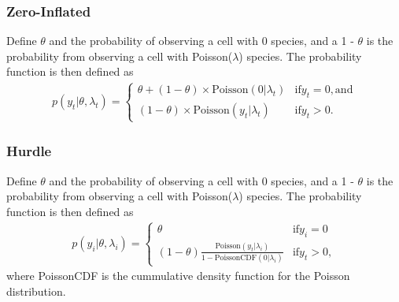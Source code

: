 \documentclass[12pt,letterpaper]{article}
\begin{document}
\subsubsection{Zero-Inflated}

Define \(\theta\) and the probability of observing a cell with 0 species, and a 1 - \(\theta\) is the probability from observing a cell with Poisson(\(\lambda\)) species. The probability function is then defined as 
\begin{equation}
  \begin{aligned}
    p(y_{t} | \theta, \lambda_{t}) = 
    \begin{cases}
      \theta + (1 - \theta) \times \mathrm{Poisson}(0 | \lambda_{t}) & \text{if} y_{t} = 0, \text{and} \\
      (1 - \theta) \times \mathrm{Poisson}(y_{t} | \lambda_{t}) & \text{if} y_{t} > 0.
    \end{cases}
  \end{aligned}
  \label{eq:zip}
\end{equation}

\subsubsection{Hurdle}

Define \(\theta\) and the probability of observing a cell with 0 species, and a 1 - \(\theta\) is the probability from observing a cell with Poisson(\(\lambda\)) species. The probability function is then defined as 
\begin{equation}
  \begin{aligned}
    p(y_{i} | \theta, \lambda_{i}) = 
    \begin{cases}
      \theta & \text{if} y_{i} = 0\\
      (1 - \theta) \frac{\mathrm{Poisson}(y_{t} | \lambda_{i})}{1 - \mathrm{PoissonCDF}(0 | \lambda_{i})} & \text{if} y_{t} > 0,
    \end{cases}
  \end{aligned}
  \label{eq:hurdle}
\end{equation}
where PoissonCDF is the cummulative density function for the Poisson distribution.
\end{document}
